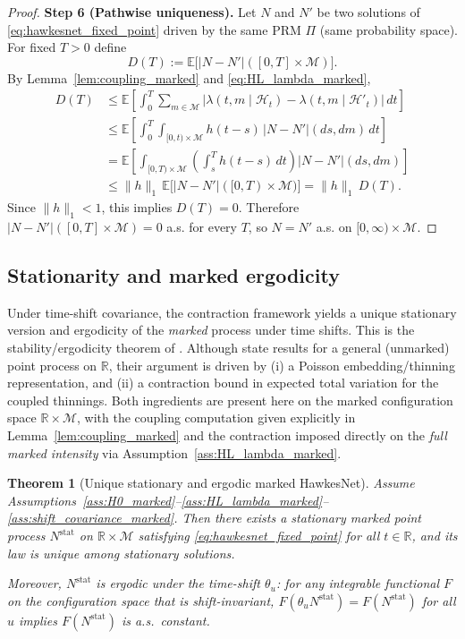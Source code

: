 \documentclass[12pt]{article}
\newtheorem{theorem}{Theorem}[section]
\begin{document}
\begin{proof}
\textbf{Step 6 (Pathwise uniqueness).}
Let $N$ and $N'$ be two solutions of \eqref{eq:hawkesnet_fixed_point} driven by the same PRM $\Pi$ (same probability space).
For fixed $T>0$ define
\[
D(T):=\mathbb E\bigl[|N-N'|([0,T]\times\mathcal M)\bigr].
\]
By Lemma~\ref{lem:coupling_marked} and \eqref{eq:HL_lambda_marked},
\begin{align*}
D(T)
&\le
\mathbb E\!\left[\int_0^T\sum_{m\in\mathcal M}\bigl|\lambda(t,m\mid \mathcal H_t)-\lambda(t,m\mid \mathcal H'_t)\bigr|\,dt\right]\\
&\le
\mathbb E\!\left[\int_0^T\int_{[0,t)\times\mathcal M} h(t-s)\,|N-N'|(ds,dm)\,dt\right]\\
&=
\mathbb E\!\left[\int_{[0,T)\times\mathcal M}\left(\int_s^T h(t-s)\,dt\right)|N-N'|(ds,dm)\right]\\
&\le
\|h\|_1\,\mathbb E\bigl[|N-N'|([0,T)\times\mathcal M)\bigr]
=
\|h\|_1\,D(T).
\end{align*}
Since $\|h\|_1<1$, this implies $D(T)=0$.
Therefore $|N-N'|([0,T]\times\mathcal M)=0$ a.s. for every $T$, so $N=N'$ a.s. on $[0,\infty)\times\mathcal M$.
\end{proof}

\subsection{Stationarity and marked ergodicity}

Under time-shift covariance, the contraction framework yields a unique stationary version and ergodicity of the \emph{marked} process under time shifts.
This is the stability/ergodicity theorem of \citep{bremaud1996stability}. Although \citep{bremaud1996stability} state results for a general (unmarked) point process on $\mathbb R$,
their argument is driven by (i) a Poisson embedding/thinning representation, and (ii) a contraction bound in expected total variation for the coupled thinnings.
Both ingredients are present here on the marked configuration space $\mathbb R\times\mathcal M$, with the coupling computation given explicitly in Lemma~\ref{lem:coupling_marked}
and the contraction imposed directly on the \emph{full marked intensity} via Assumption~\ref{ass:HL_lambda_marked}.

\begin{theorem}[Unique stationary and ergodic marked HawkesNet]
\label{thm:stationary_ergodic_marked}
Assume Assumptions~\ref{ass:H0_marked}--\ref{ass:HL_lambda_marked}--\ref{ass:shift_covariance_marked}.
Then there exists a stationary marked point process $N^{\mathrm{stat}}$ on $\mathbb R\times\mathcal M$ satisfying \eqref{eq:hawkesnet_fixed_point} for all $t\in\mathbb R$,
and its law is unique among stationary solutions.

Moreover, $N^{\mathrm{stat}}$ is ergodic under the time-shift $\theta_u$:
for any integrable functional $F$ on the configuration space that is shift-invariant,
$F(\theta_u N^{\mathrm{stat}})=F(N^{\mathrm{stat}})$ for all $u$ implies $F(N^{\mathrm{stat}})$ is a.s.\ constant.
\end{theorem}
\end{document}
